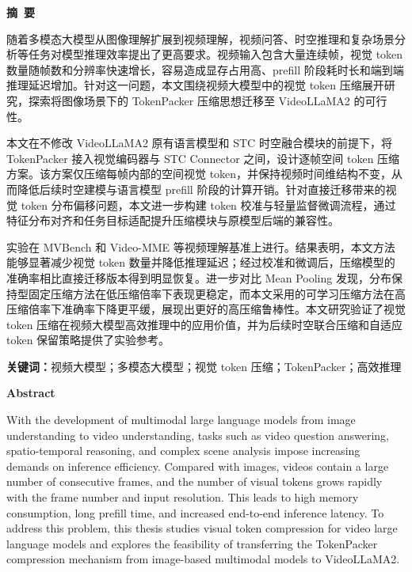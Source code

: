 \cleardoublepage{}
\begin{center}
    \bfseries {} 摘~要
\end{center}

随着多模态大模型从图像理解扩展到视频理解，视频问答、时空推理和复杂场景分析等任务对模型推理效率提出了更高要求。视频输入包含大量连续帧，视觉 token 数量随帧数和分辨率快速增长，容易造成显存占用高、prefill 阶段耗时长和端到端推理延迟增加。针对这一问题，本文围绕视频大模型中的视觉 token 压缩展开研究，探索将图像场景下的 TokenPacker 压缩思想迁移至 VideoLLaMA2 的可行性。

本文在不修改 VideoLLaMA2 原有语言模型和 STC 时空融合模块的前提下，将 TokenPacker 接入视觉编码器与 STC Connector 之间，设计逐帧空间 token 压缩方案。该方案仅压缩每帧内部的空间视觉 token，并保持视频时间维结构不变，从而降低后续时空建模与语言模型 prefill 阶段的计算开销。针对直接迁移带来的视觉 token 分布偏移问题，本文进一步构建 token 校准与轻量监督微调流程，通过特征分布对齐和任务目标适配提升压缩模块与原模型后端的兼容性。

实验在 MVBench 和 Video-MME 等视频理解基准上进行。结果表明，本文方法能够显著减少视觉 token 数量并降低推理延迟；经过校准和微调后，压缩模型的准确率相比直接迁移版本得到明显恢复。进一步对比 Mean Pooling 发现，分布保持型固定压缩方法在低压缩倍率下表现更稳定，而本文采用的可学习压缩方法在高压缩倍率下准确率下降更平缓，展现出更好的高压缩鲁棒性。本文研究验证了视觉 token 压缩在视频大模型高效推理中的应用价值，并为后续时空联合压缩和自适应 token 保留策略提供了实验参考。

\textbf{关键词：}视频大模型；多模态大模型；视觉 token 压缩；TokenPacker；高效推理

\cleardoublepage{}
\begin{center}
    \bfseries {} Abstract
\end{center}

With the development of multimodal large language models from image understanding to video understanding, tasks such as video question answering, spatio-temporal reasoning, and complex scene analysis impose increasing demands on inference efficiency. Compared with images, videos contain a large number of consecutive frames, and the number of visual tokens grows rapidly with the frame number and input resolution. This leads to high memory consumption, long prefill time, and increased end-to-end inference latency. To address this problem, this thesis studies visual token compression for video large language models and explores the feasibility of transferring the TokenPacker compression mechanism from image-based multimodal models to VideoLLaMA2.

